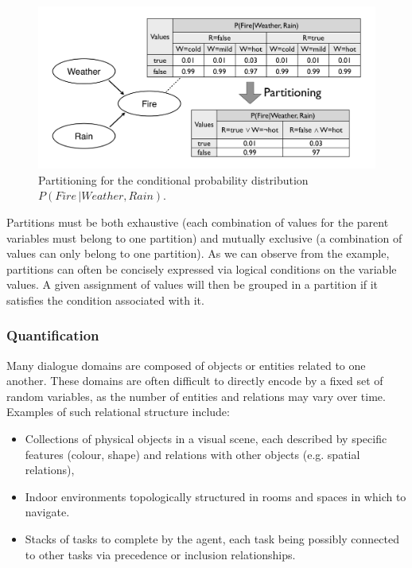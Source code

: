 

 \begin{figure}[h]
\centering
\includegraphics[scale=0.25]{imgs/partitioning.pdf}
\caption{Partitioning for the conditional probability distribution $P(\mathit{Fire} \, | \mathit{Weather}, \mathit{Rain})$.}
\label{fig:partitioning}
\end{figure}

Partitions must be both exhaustive (each combination of values for the parent variables must belong to one partition) and mutually exclusive (a combination of values can only belong to one partition).  As we can observe from the example, partitions can often be concisely expressed via logical conditions on the variable values.  A given assignment of values will then be grouped in a partition if it satisfies the condition associated with it.

\subsubsection*{Quantification}

Many dialogue domains are composed of objects or entities related to one another. These domains are often difficult to directly encode by a fixed set of random variables, as the number of entities and relations may vary over time.  Examples of such relational structure include: 
\begin{itemize}
\item Collections of physical objects in a visual scene, each described by specific features (colour, shape) and relations with other objects (e.g. spatial relations),
\item Indoor environments topologically structured in rooms and spaces in which to navigate. 
\item Stacks of tasks to complete by the agent, each task being possibly connected to other tasks via precedence or inclusion relationships.
\end{itemize}

